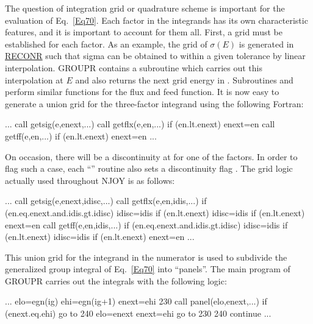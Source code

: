 The question of integration grid or quadrature scheme is important for
the evaluation of Eq.~\ref{Eq70}.  Each factor in the integrands has its
own characteristic features, and it is important to account for them all.
First, a grid must be established for each factor.  As an example, the
grid of $\sigma(E)$ is generated in
\hyperlink{sRECONRhy}{RECONR} such
that sigma can be obtained to within a given tolerance by
linear interpolation.  GROUPR contains a subroutine
 which carries out this
interpolation at $E$ and also returns the next grid energy in
.  Subroutines 
and  perform similar functions
for the flux and feed function.  It is now easy to generate a
union grid for the three-factor integrand using the following Fortran:

\small
\begin{ccode}
       ...
      call getsig(e,enext,...)
      call getflx(e,en,...)
      if (en.lt.enext) enext=en
      call getff(e,en,...)
      if (en.lt.enext) enext=en
       ...
\end{ccode}
\normalsize

\noindent
On occasion, there will be a discontinuity at  for one of the
factors.  In order to flag such a case, each ``'' routine
also sets a discontinuity flag .  The grid logic actually
used throughout NJOY is as follows:

\small
\begin{ccode}
     ...
      call getsig(e,enext,idisc,...)
      call getflx(e,en,idis,...)
      if (en.eq.enext.and.idis.gt.idisc) idisc=idis
      if (en.lt.enext) idisc=idis
      if (en.lt.enext) enext=en
      call getff(e,en,idis,...)
      if (en.eq.enext.and.idis.gt.idisc) idisc=idis
      if (en.lt.enext) idisc=idis
      if (en.lt.enext) enext=en
      ...
\end{ccode}
\normalsize

\noindent
This union grid for the integrand in the numerator is used to subdivide
the generalized group integral of Eq.~\ref{Eq70} into ``panels''.  The
main program of GROUPR carries out the integrals with the following logic:

\small
\begin{ccode}
      ...
      elo=egn(ig)
      ehi=egn(ig+1)
      enext=ehi
  230 call panel(elo,enext,...)
      if (enext.eq.ehi) go to 240
      elo=enext
      enext=ehi
      go to 230
  240 continue
      ...
\end{ccode}
\normalsize

